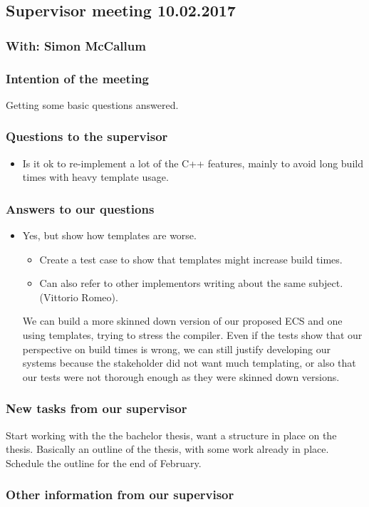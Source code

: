 \documentclass{article}
\begin{document}
\begin{center}
\subsection*{Supervisor meeting 10.02.2017}
\subsubsection*{With: Simon McCallum}
\end{center}

\bigskip

\subsubsection*{Intention of the meeting}
Getting some basic questions answered.


\subsubsection*{Questions to the supervisor}
\begin{itemize}
    \item 
    Is it ok to re-implement a lot of the C++ features, mainly to avoid long build times with heavy template usage.
\end{itemize}

\subsubsection*{Answers to our questions}
\begin{itemize}
    \item
    Yes, but show how templates are worse.
    \begin{itemize}
        \item
        Create a test case to show that templates might increase build times. 
        \item
        Can also refer to other implementors writing about the same subject. (Vittorio Romeo).
    \end{itemize}
    We can build a more skinned down version of our proposed ECS and one using templates, trying to stress the compiler.
    Even if the tests show that our perspective on build times is wrong, 
    we can still justify developing our systems because the stakeholder did not want much templating, 
    or also that our tests were not thorough enough as they were skinned down versions.
\end{itemize}

\subsubsection*{New tasks from our supervisor}
Start working with the the bachelor thesis, want a structure in place on the thesis.
Basically an outline of the thesis, with some work already in place.
Schedule the outline for the end of February.

\subsubsection*{Other information from our supervisor}
\end{document}
